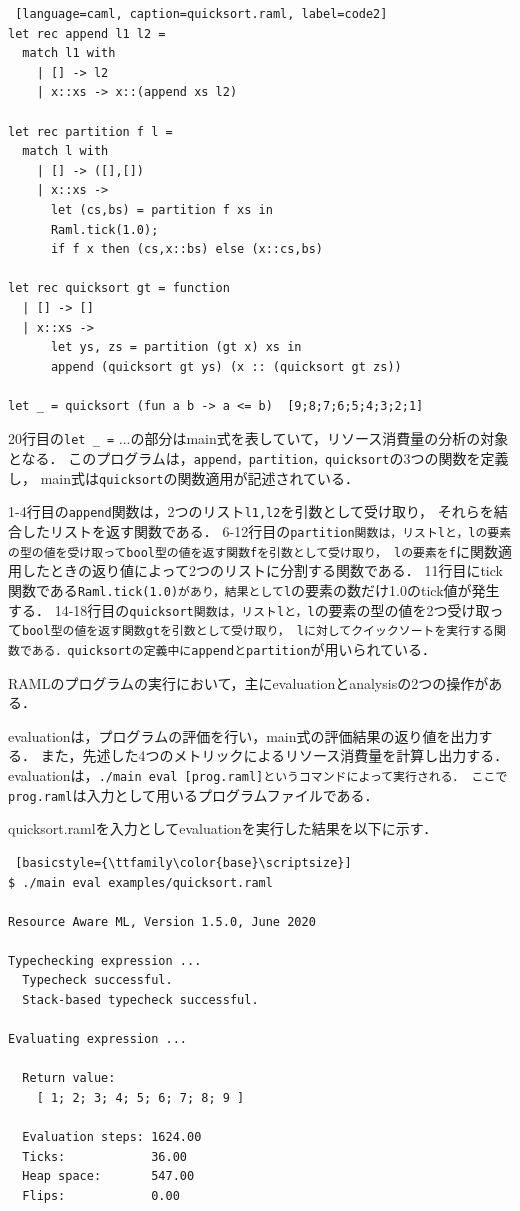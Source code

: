\documentclass{kuisthesis}
\begin{document}
\begin{lstlisting} [language=caml, caption=quicksort.raml, label=code2]
let rec append l1 l2 =
  match l1 with
    | [] -> l2
    | x::xs -> x::(append xs l2)

let rec partition f l =
  match l with
    | [] -> ([],[])
    | x::xs ->
      let (cs,bs) = partition f xs in
      Raml.tick(1.0);
      if f x then (cs,x::bs) else (x::cs,bs)

let rec quicksort gt = function
  | [] -> []
  | x::xs ->
      let ys, zs = partition (gt x) xs in
      append (quicksort gt ys) (x :: (quicksort gt zs))

let _ = quicksort (fun a b -> a <= b)  [9;8;7;6;5;4;3;2;1]
\end{lstlisting}

20行目の{\tt let \_ =} ...の部分はmain式を表していて，リソース消費量の分析の対象となる．
このプログラムは，{\tt append，partition，quicksort}の3つの関数を定義し，
main式は{\tt quicksort}の関数適用が記述されている．

1-4行目の{\tt append}関数は，2つのリスト{\tt l1,l2}を引数として受け取り，
それらを結合したリストを返す関数である．
6-12行目の{\tt partition関数は，リストlと，lの要素の型の値を受け取ってbool型の値を返す関数fを引数として受け取り，
lの要素をf}に関数適用したときの返り値によって2つのリストに分割する関数である．
11行目にtick関数である{\tt Raml.tick(1.0)があり，結果としてl}の要素の数だけ1.0のtick値が発生する．
14-18行目の{\tt quicksort関数は，リストlと，l}の要素の型の値を2つ受け取って{\tt bool型の値を返す関数gtを引数として受け取り，
lに対してクイックソートを実行する関数である．quicksortの定義中にappendとpartition}が用いられている．

RAMLのプログラムの実行において，主にevaluationとanalysisの2つの操作がある．

evaluationは，プログラムの評価を行い，main式の評価結果の返り値を出力する．
また，先述した4つのメトリックによるリソース消費量を計算し出力する．
evaluationは，{\tt ./main eval [prog.raml]というコマンドによって実行される．
ここでprog.raml}は入力として用いるプログラムファイルである．

quicksort.ramlを入力としてevaluationを実行した結果を以下に示す．

\begin{lstlisting} [basicstyle={\ttfamily\color{base}\scriptsize}]
$ ./main eval examples/quicksort.raml

Resource Aware ML, Version 1.5.0, June 2020

Typechecking expression ...
  Typecheck successful.
  Stack-based typecheck successful.

Evaluating expression ...

  Return value:
    [ 1; 2; 3; 4; 5; 6; 7; 8; 9 ]

  Evaluation steps: 1624.00
  Ticks:            36.00
  Heap space:       547.00
  Flips:            0.00

\end{lstlisting}
\end{document}
